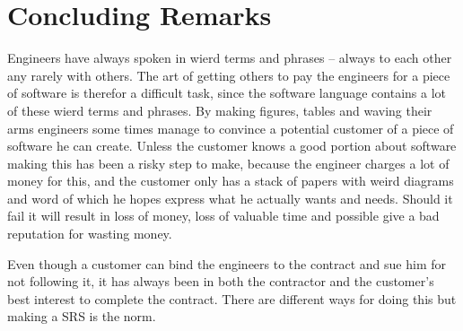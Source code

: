 \documentclass[Main]{subfiles}
\begin{document}
\section{Concluding Remarks}

Engineers have always spoken in wierd terms and phrases -- always to each other any rarely with others.
The art of getting others to pay the engineers for a piece of software is therefor a difficult task, since the software language contains a lot of these wierd terms and phrases.
By making figures, tables and waving their arms engineers some times manage to convince a potential customer of a piece of software he can create.
Unless the customer knows a good portion about software making this has been a risky step to make, because the engineer charges a lot of money for this, and the customer only has a stack of papers with weird diagrams and word of which he hopes express what he actually wants and needs.
Should it fail it will result in loss of money, loss of valuable time and possible give a bad reputation for wasting money.

Even though a customer can bind the engineers to the contract and sue him for not following it, it has always been in both the contractor and the customer's best interest to complete the contract.
There are different ways for doing this but making a SRS is the norm.
\end{document}
